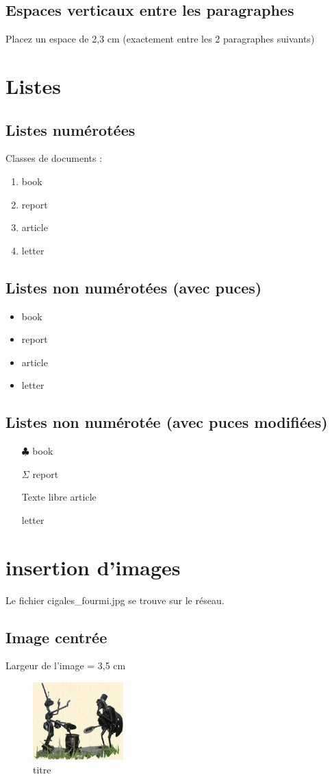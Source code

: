\documentclass{article}
\begin{document}
\subsection{Espaces verticaux entre les paragraphes}
Placez un espace de 2,3 cm (exactement entre les 2 paragraphes suivants)
\vspace{5mm}
\lipsum[5]
\vspace{2,3cm}
\lipsum[6]
\section{Listes}
\subsection{Listes numérotées}
Classes de documents :
\begin{enumerate}
    \item book
    \item report
    \item article
    \item letter
  \end{enumerate}
\subsection{Listes non numérotées (avec puces)}
\begin{itemize}
    \item book
    \item report
    \item article
    \item letter
  \end{itemize}
\subsection{Listes non numérotée (avec puces modifiées)}
\begin{itemize}
    \item[$\clubsuit $] book
    \item[$\Sigma $] report
    \item[Texte libre] article
    \item[\ding{36}] letter 
\end{itemize}
\section{insertion d'images}
Le fichier cigales\_fourmi.jpg se trouve sur le réseau.
\subsection{Image centrée}
Largeur de l'image = 3,5 cm
\begin{figure}[h]
    \centering
    \includegraphics[width=3.5cm]{images/cigale_fourmi.jpg}
    \caption{\label{étiquette} titre}
 \end{figure}
\end{document}
